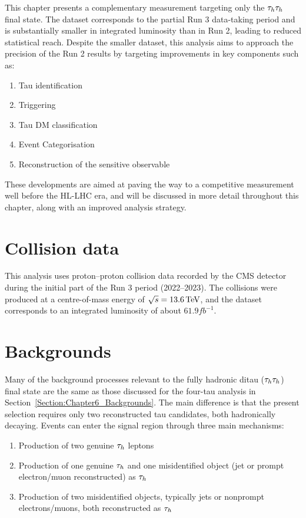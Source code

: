 This chapter presents a complementary measurement targeting only the $\tau_h \tau_h$ final state. The dataset corresponds to the partial Run 3 data-taking period and is substantially smaller in integrated luminosity than in Run 2, leading to reduced statistical reach. Despite the smaller dataset, this analysis aims to approach the precision of the Run 2 results by targeting improvements in key components such as:

\begin{enumerate}[label=(\roman*)]
    \item Tau identification
    \item Triggering
    \item Tau \ac{DM} classification
    \item Event Categorisation
    \item Reconstruction of the sensitive observable
\end{enumerate}

These developments are aimed at paving the way to a competitive measurement well before the \ac{HL}-\ac{LHC} era, and will be discussed in more detail throughout this chapter, along with an improved analysis strategy.

\section{Collision data}

This analysis uses proton–proton collision data recorded by the \ac{CMS} detector during the initial part of the Run 3 period (2022–2023). The collisions were produced at a centre-of-mass energy of $\sqrt{s} = 13.6\,\text{Te\hspace{-.08em}V}$, and the dataset corresponds to an integrated luminosity of about $61.9\unit{fb}^{-1}$.

\section{Backgrounds}
\label{Section:Chapter7_Backgrounds}

Many of the background processes relevant to the fully hadronic ditau ($\tau_h\tau_h$) final state are the same as those discussed for the four-tau analysis in Section~\ref{Section:Chapter6_Backgrounds}. The main difference is that the present selection requires only two reconstructed tau candidates, both hadronically decaying. Events can enter the signal region through three main mechanisms:  

\begin{enumerate}[label=(\roman*)]
    \item Production of two genuine $\tau_h$ leptons  
    \item Production of one genuine $\tau_h$ and one misidentified object (jet or prompt electron/muon reconstructed) as $\tau_h$
    \item Production of two misidentified objects, typically jets or nonprompt electrons/muons, both reconstructed as $\tau_h$
\end{enumerate}


